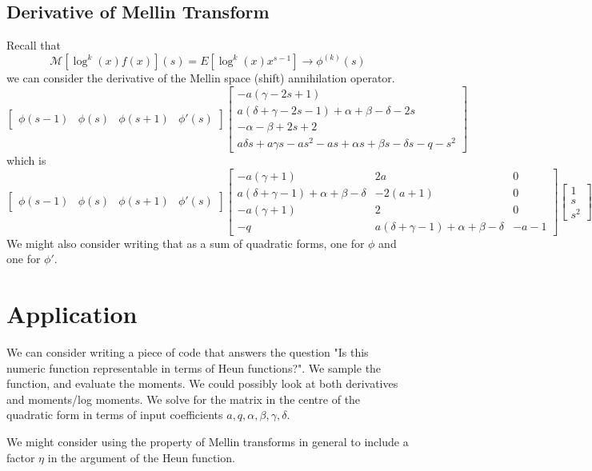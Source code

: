 \documentclass{article}
\begin{document}
\subsection{Derivative of Mellin Transform}
Recall that 
$$
\mathcal{M}[\log^k(x) f(x)](s) = E[\log^k(x) x^{s-1}] \to \phi^{(k)}(s)
$$
we can consider the derivative of the Mellin space (shift) annihilation operator. 
$$
\begin{bmatrix}
\phi(s-1) & \phi(s) & \phi(s+1) & \phi'(s)
\end{bmatrix}
\begin{bmatrix}
-a (\gamma -2 s+1)\\
a (\delta +\gamma -2 s-1)+\alpha +\beta -\delta -2 s\\
 -\alpha -\beta +2 s+2\\
a \delta  s+a \gamma  s-a s^2-a s+\alpha  s+\beta  s-\delta  s-q-s^2
\end{bmatrix}
$$
which is
$$
\begin{bmatrix}
\phi(s-1) & \phi(s) & \phi(s+1) & \phi'(s)
\end{bmatrix}
\begin{bmatrix}
 -a (\gamma +1) & 2a & 0\\
a (\delta +\gamma -1)+\alpha +\beta -\delta & -2 (a+1) & 0\\
-a (\gamma +1) & 2 & 0\\
-q & a (\delta +\gamma -1)+\alpha +\beta -\delta & -a-1
\end{bmatrix}
\begin{bmatrix}
1 \\ s \\ s^2
\end{bmatrix}
$$
We might also consider writing that as a sum of quadratic forms, one for $\phi$ and one for $\phi'$.

\section{Application}
We can consider writing a piece of code that answers the question "Is this numeric function representable in terms of Heun functions?". We sample the function, and evaluate the moments. We could possibly look at both derivatives and moments/log moments. We solve for the matrix in the centre of the quadratic form in terms of input coefficients $a,q,\alpha,\beta,\gamma,\delta$.

We might consider using the property of Mellin transforms in general to include a factor $\eta$ in the argument of the Heun function.
\end{document}
